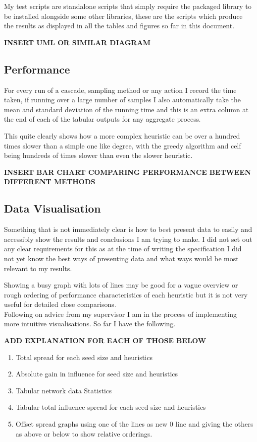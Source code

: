 \documentclass{article}
\begin{document}
My test scripts are standalone scripts that simply require the packaged library to be installed alongside some other libraries, these are the scripts which produce the results as displayed in all the tables and figures so far in this document.

\textbf{INSERT UML OR SIMILAR DIAGRAM}

\subsection{Performance}

For every run of a cascade, sampling method or any action I record the time taken, if running over a large number of samples I also automatically take the mean and standard deviation of the running time and this is an extra column at the end of each of the tabular outputs for any aggregate process.

This quite clearly shows how a more complex heuristic can be over a hundred times slower than a simple one like degree, with the greedy algorithm and celf being hundreds of times slower than even the slower heuristic.

\textbf{INSERT BAR CHART COMPARING PERFORMANCE BETWEEN DIFFERENT METHODS}

\subsection{Data Visualisation}

Something that is not immediately clear is how to best present data to easily and accessibly show the results and conclusions I am trying to make. I did not set out any clear requirements for this as at the time of writing the specification I did not yet know the best ways of presenting data and what ways would be most relevant to my results.

Showing a busy graph with lots of lines may be good for a vague overview or rough ordering of performance characteristics of each heuristic but it is not very useful for detailed close comparisons.
\\

Following on advice from my supervisor I am in the process of implementing more intuitive visualisations. 
So far I have the following.

\textbf{ADD EXPLANATION FOR EACH OF THOSE BELOW}
\begin{enumerate}
	\item Total spread for each seed size and heuristics
	\item Absolute gain in influence for seed size and heuristics
	\item Tabular network data Statistics
	\item Tabular total influence spread for each seed size and heuristics
	\item Offset spread graphs using one of the lines as new 0 line and giving the others as above or below to show relative orderings.
\end{enumerate}
\end{document}
